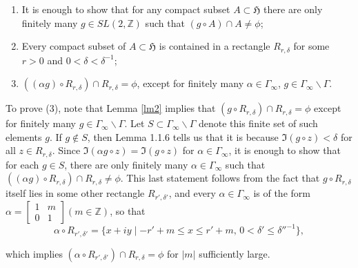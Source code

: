 \documentclass[12pt]{article} %
\begin{document}
\begin{enumerate}
  \item It is enough to show that for any compact subset $A \subset \mathfrak{H}$ there are only finitely many $g \in SL(2, \mathbb{Z})$ such that $(g \circ A) \cap A \neq \phi$;

  \item Every compact subset of $A \subset \mathfrak{H}$ is contained in a rectangle $R_{r,\delta}$ for some $r > 0$ and $0 < \delta < \delta^{-1}$;

  \item $((\alpha g) \circ R_{r,\delta}) \cap R_{r,\delta} = \phi$, except for finitely many $\alpha \in \Gamma_{\infty}$, $g \in \Gamma_{\infty}\backslash \Gamma$.
\end{enumerate}

To prove (3), note that Lemma \ref{lm2} implies that $(g \circ R_{r,\delta}) \cap R_{r,\delta} = \phi$ except for finitely many $g \in \Gamma_{\infty}\backslash \Gamma$. Let $S \subset \Gamma_{\infty}\backslash \Gamma$ denote this finite set of such elements $g$. If $g \not\in S$, then Lemma 1.1.6 tells us that it is because $\Im(g \circ z) < \delta$ for all $z \in R_{r,\delta}$. Since $\Im(\alpha g \circ z) = \Im(g \circ z)$ for $\alpha \in \Gamma_{\infty}$, it is enough to show that for each $g \in S$, there are only finitely many $\alpha \in \Gamma_{\infty}$ such that $((\alpha g) \circ R_{r,\delta}) \cap R_{r,\delta} \neq \phi$. This last statement follows from the fact that $g \circ R_{r,\delta}$ itself lies in some other rectangle $R_{r',\delta'}$, and every $\alpha \in \Gamma_{\infty}$ is of the form $\alpha =
  \begin{bmatrix}
    1 & m \\
    0 & 1
  \end{bmatrix}
  (m \in \mathbb{Z})$, so that
\[
  \alpha \circ R_{r',\delta'} = \{x + iy \mid -r' + m \leq x \leq r' + m, \, 0 < \delta' \leq \delta''^{-1}\},
\]

which implies $(\alpha \circ R_{r',\delta'}) \cap R_{r,\delta} = \phi$ for $|m|$ sufficiently large.
\end{document}
